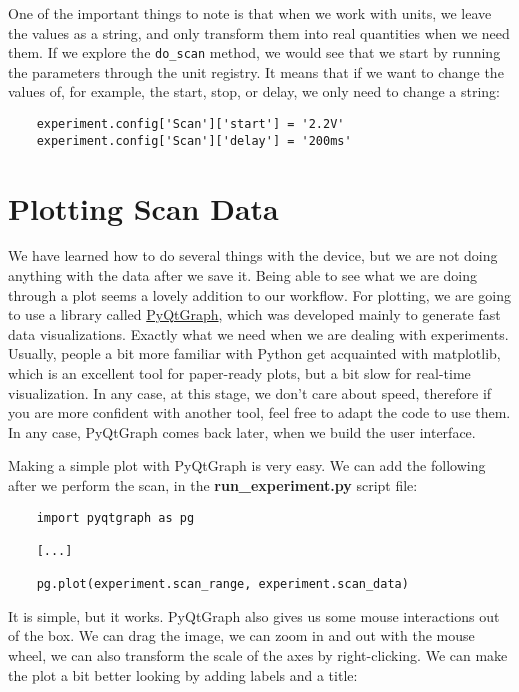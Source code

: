 One of the important things to note is that when we work with units, we leave the values as a string, and only transform them into real quantities when we need them. If we explore the \texttt{do\_scan} method, we would see that we start by running the parameters through the unit registry. It means that if we want to change the values of, for example, the start, stop, or delay, we only need to change a string:

\begin{verbatim}
    experiment.config['Scan']['start'] = '2.2V'
    experiment.config['Scan']['delay'] = '200ms'
\end{verbatim}

\section{Plotting Scan Data}\label{sec:basic-plotting}
We have learned how to do several things with the device, but we are not doing anything with the data after we save it. Being able to see what we are doing through a plot seems a lovely addition to our workflow. For plotting, we are going to use a library called \href{http://www.pyqtgraph.org/}{PyQtGraph}, which was developed mainly to generate fast data visualizations. Exactly what we need when we are dealing with experiments. Usually, people a bit more familiar with Python get acquainted with matplotlib, which is an excellent tool for paper-ready plots, but a bit slow for real-time visualization. In any case, at this stage, we don't care about speed, therefore if you are more confident with another tool, feel free to adapt the code to use them. In any case, PyQtGraph comes back later, when we build the user interface.

Making a simple plot with PyQtGraph is very easy. We can add the following after we perform the scan, in the \textbf{run\_experiment.py} script file:

\begin{verbatim}
    import pyqtgraph as pg

    [...]

    pg.plot(experiment.scan_range, experiment.scan_data)
\end{verbatim}

It is simple, but it works. PyQtGraph also gives us some mouse interactions out of the box. We can drag the image, we can zoom in and out with the mouse wheel, we can also transform the scale of the axes by right-clicking. We can make the plot a bit better looking by adding labels and a title:

